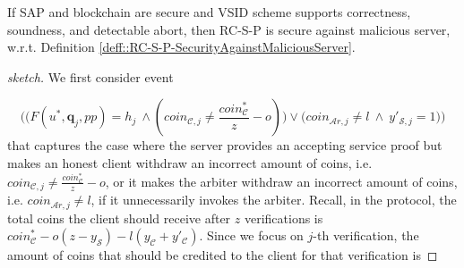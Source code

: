 
 \begin{lemma}\label{lem::RC-S-P-SecurityAgainstMaliciousServer}
 If SAP and blockchain are secure and  VSID scheme supports correctness, soundness, and detectable abort, then RC-S-P is secure against malicious server, w.r.t. Definition \ref{deff::RC-S-P-SecurityAgainstMaliciousServer}. 
 \end{lemma}
 

 \begin{proof}[sketch]
 We first consider event  
 
  $$\Bigg(\Big(F(u^{\scriptscriptstyle *}, \bm{q}_{\scriptscriptstyle j},{pp})= h_{\scriptscriptstyle j}\ \wedge (coin_{\scriptscriptstyle\mathcal{C},j}\neq  \frac{coin_{\scriptscriptstyle\mathcal C}^{\scriptscriptstyle*}}{z}-o)\Big)  \vee\Big(coin_{\scriptscriptstyle\mathcal{A}r,j}\neq l\ \wedge\  y'_{\scriptscriptstyle \mathcal {S},j}=1\Big)\Bigg)$$
   that captures the case where the server provides an accepting service proof but makes an honest client withdraw an incorrect amount of coins, i.e. $coin_{\scriptscriptstyle\mathcal{C},j}\neq  \frac{coin_{\scriptscriptstyle\mathcal C}^{\scriptscriptstyle*}}{z}-o$, or it makes the arbiter withdraw an incorrect amount of coins, i.e. $coin_{\scriptscriptstyle\mathcal{A}r,j}\neq l$, if it unnecessarily invokes the arbiter. Recall, in the protocol, the total coins the client should receive after $z$ verifications is $coin^{\scriptscriptstyle *}_{\scriptscriptstyle\mathcal C}-o(z-y_{\scriptscriptstyle\mathcal S})-l (y_{\scriptscriptstyle\mathcal C}+y'_{\scriptscriptstyle\mathcal C})$. Since we focus on  $j$-th verification, the amount of  coins that should be credited to the client for that verification is
 
 
% 
  

\end{proof}

